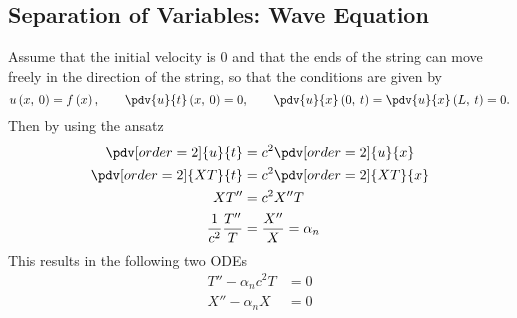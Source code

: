 \documentclass{article}
\begin{document}
\subsection{Separation of Variables: Wave Equation}
Assume that the initial velocity is 0 and that the ends of the string can move freely in the direction of the string,
so that the conditions are given by
\begin{equation*}
    u\left( x,\: 0 \right) = f\left( x \right), \quad \quad \pdv{u}{t} \left( x,\: 0 \right) = 0, \quad \quad \pdv{u}{x} \left( 0,\: t \right) = \pdv{u}{x} \left( L,\: t \right) = 0.
\end{equation*}
Then by using the ansatz
\begin{align*}
    \pdv[order=2]{u}{t}         & = c^2\pdv[order=2]{u}{x}   \\
    \pdv[order=2]{XT}{t}        & = c^2\pdv[order=2]{XT}{x}  \\
    XT''                        & = c^2X''T                  \\
    \frac{1}{c^2} \frac{T''}{T} & = \frac{X''}{X} = \alpha_n
\end{align*}
This results in the following two ODEs
\begin{align*}
    T'' - \alpha_n c^2 T & = 0 \\
    X'' - \alpha_n X     & = 0
\end{align*}
\end{document}
